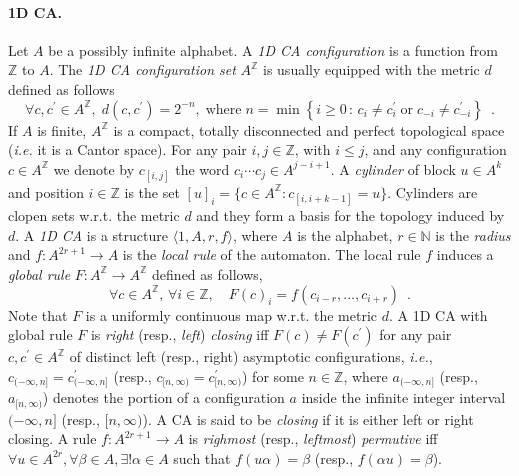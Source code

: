 \documentclass{llncs}
\makeatletter
\newcommand{\z}{\ensuremath{\mathbb{Z}}\xspace}
\newcommand{\n}{\ensuremath{\mathbb{N}}\xspace}
\newcommand{\ie}{\emph{i.e.}\@\xspace}
\newcommand{\az}{\ensuremath{A^{\mathbb{Z}}}\xspace}
\newcommand{\set}[1]{\left\{#1\right\}}
\newcommand{\wrt}{w.r.t.\@\xspace}
\makeatother
\begin{document}
\paragraph{{\bf 1D CA.}} Let $A$ be a possibly infinite alphabet. A \emph{1D CA
configuration} is a function from $\z$ to $A$. The \emph{1D CA
configuration set} $\az$ is usually equipped with the metric $d$
defined as follows
\[
\forall c,c^\prime\in\az,\;
d(c,c^\prime)=2^{-n},\;\text{where}\;n=\min\set{i\geq 0\,:\,c_i\ne
c^\prime_i \;\text{or}\;c_{-i}\ne c^\prime_{-i}}\enspace.
\]
If $A$ is finite, $\az$ is a compact, totally disconnected and
perfect topological space (\ie it is a Cantor space). For any
pair $i,j\in\z$, with $i\leq j$, and any configuration $c\in\az$
we denote by $c_{[i,j]}$ the word $c_i\cdots c_j\in A^{j-i+1}$.
A \emph{cylinder} of block $u\in A^k$ and position $i\in\z$ is the
set $[u]_i=\{c\in A^{\z}: c_{[i, i+k-1]}=u\}$. Cylinders are
clopen sets \wrt the metric $d$ and they form a basis for the
topology induced by $d$.
A \emph{1D CA} is a structure $\langle 1, A, r, f\rangle$, where
$A$ is the alphabet, $r\in\n$ is the \emph{radius} and $f:
A^{2r+1} \to A$ is the \emph{local rule} of the automaton. The
local rule $f$ induces a \emph{global rule} $F:\az\to\az$ defined
as follows,
\[
\forall c\in \az,\,\forall i\in\z ,\quad F(c)_i= f(c_{i-r},
\ldots, c_{i+r})\enspace.
\]
Note that $F$ is a uniformly continuous map \wrt the metric $d$.
A 1D CA with global rule $F$ is \emph{right} (resp., \emph{left})
\emph{closing} iff $F(c)\neq F(c^\prime)$ for any pair
$c,c^\prime\in\az$ of distinct left (resp., right) asymptotic
configurations, \ie, $c_{(-\infty,n]}=c^\prime_{(-\infty,n]}$
(resp., $c_{[n,\infty)}=c^\prime_{[n,\infty)}$) for some $n\in\z$,
where $a_{(-\infty,n]}$ (resp., $a_{[n, \infty)}$) denotes the
portion of a configuration $a$ inside the infinite integer
interval $(-\infty,n]$ (resp., $[n, \infty)$). A CA is said to be
\emph{closing} if it is either left or right closing. A rule
$f:A^{2r+1} \to A$ is \emph{righmost} (resp., \emph{leftmost})
\emph{permutive} iff $\forall u\in A^{2r}, \forall\beta\in
A,\exists! \alpha\in A$ such that $f(u\alpha)=\beta$ (resp.,
$f(\alpha u)=\beta$).
\end{document}
